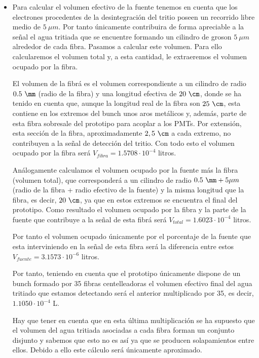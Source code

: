 \begin{itemize}
 \item{} Para calcular el volumen efectivo de la fuente tenemos en cuenta que los electrones procedentes de la desintegración del tritio poseen un recorrido libre medio de $5~\mu m$. Por tanto únicamente contribuira de forma apreciable a la señal el agua tritiada que se encuentre formando un cilindro de groson $5~\mu m$ alrededor de cada fibra. Pasamos a calcular este volumen. Para ello calcularemos el volumen total y, a esta cantidad, le extraeremos el volumen ocupado por la fibra.

El volumen de la fibrá es el volumen correspondiente a un cilindro de radio $0.5~\mm$ (radio de la fibra) y una longitud efectiva de $20~\cm$, donde se ha tenido en cuenta que, aunque la longitud real de la fibra son $25~\cm$, esta contiene en los extremos del bunch unos aros metálicos y, además, parte de esta fibra sobresale del prototipo para acoplar a los PMTs. Por extensión, esta sección de la fibra, aproximadamente $2,5~\cm$ a cada extremo,  no contribuyen a la señal de detección del tritio. Con todo esto el volumen ocupado por la fibra será $V_{fibra}=1.5708 \cdotp 10^{-4}$ litros.

Análogamente calculamos el volumen ocupado por la fuente más la fibra (volumen total), que corresponderá a un cilindro de radio $0.5~\mm+5\mu m$ (radio de la fibra + radio efectivo de la fuente) y la misma longitud que la fibra, es decir, $20~\cm$, ya que en estos extremos se encuentra el final del prototipo. Como resultado el volumen ocupado por la fibra y la parte de la fuente que contribuye a la señal de esta fibrá será $V_{total}=1.6023 \cdotp 10^{-4}$ litros. 

Por tanto el volumen ocupado únicamente por el porcentaje de la fuente que esta interviniendo en la señal de esta fibra será la diferencia entre estos $V_{fuente}=3.1573 \cdotp 10^{-6}$ litros.
 
Por tanto, teniendo en cuenta que el prototipo únicamente dispone de un bunch formado por 35 fibras centelleadoras el volumen efectivo final del agua tritiado que estamos detectando será el anterior multiplicado por 35, es decir, $1.1050 \cdotp 10^{-4}$ L. 

Hay que tener en cuenta que en esta última multiplicación se ha supuesto que el volumen del agua tritiada asociadas a cada fibra forman un conjunto disjunto y sabemos que esto no es así ya que se producen solapamientos entre ellos. Debido a ello este cálculo será únicamente aproximado.


\end{itemize}
